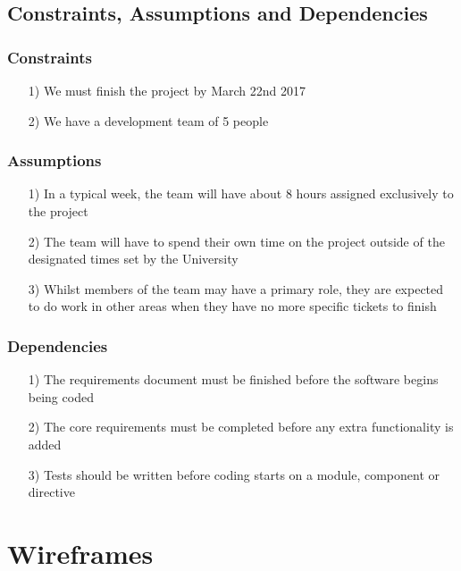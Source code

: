 \documentclass[10pt,a4paper]{article}
\begin{document}
\subsection{Constraints, Assumptions and Dependencies}

\subsubsection*{Constraints}
\begin{itemize}
\item[1)]
We must finish the project by March 22nd 2017

\item[2)]
We have a development team of 5 people
\end{itemize}

\subsubsection*{Assumptions}
\begin{itemize}
\item[1)]
In a typical week, the team will have about 8 hours assigned exclusively to the project

\item[2)]
The team will have to spend their own time on the project outside of the designated times set by the University

\item[3)]
Whilst members of the team may have a primary role, they are expected to do work in other areas when they have no more specific tickets to finish
\end{itemize}

\subsubsection*{Dependencies}
\begin{itemize}
\item[1)]
The requirements document must be finished before the software begins being coded

\item[2)]
The core requirements must be completed before any extra functionality is added

\item[3)]
Tests should be written before coding starts on a module, component or directive
\end{itemize}


\newpage
\section{Wireframes}
\end{document}
